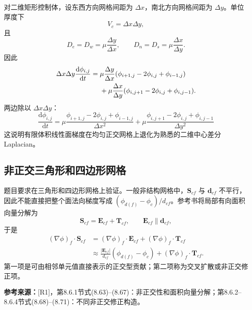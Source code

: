 \documentclass[UTF8,12pt,a4paper]{ctexart}
\numberwithin{equation}{section}
\newcommand{\Rone}{\textnormal{[R1]}}
\newcommand{\source}[1]{%
  \par\smallskip
  \noindent\colorbox{sourcebg}{%
    \parbox{0.955\linewidth}{\raggedright\footnotesize\color{sourcegray}\textbf{参考来源：}#1}%
  }
  \par\smallskip
}
\newcommand{\Sf}{\bm S}
\newcommand{\Ef}{\bm E}
\newcommand{\Tf}{\bm T}
\begin{document}
对二维矩形控制体，设东西方向网格间距为 $\Delta x$，南北方向网格间距为 $\Delta y$。单位厚度下
\begin{equation}
  V_c=\Delta x\Delta y,
  \label{eq:rect_volume}
\end{equation}
且
\begin{equation}
  D_e=D_w=\mu\frac{\Delta y}{\Delta x},
  \qquad
  D_n=D_s=\mu\frac{\Delta x}{\Delta y}.
  \label{eq:rect_D}
\end{equation}
因此
\begin{align}
  \Delta x\Delta y\frac{\mathrm d\phi_{i,j}}{\mathrm dt}
  ={}&\mu\frac{\Delta y}{\Delta x}
  (\phi_{i+1,j}-2\phi_{i,j}+\phi_{i-1,j})
  \notag\\
  &+\mu\frac{\Delta x}{\Delta y}
  (\phi_{i,j+1}-2\phi_{i,j}+\phi_{i,j-1}).
  \label{eq:rect_before_divide}
\end{align}
两边除以 $\Delta x\Delta y$：
\begin{equation}
  \boxed{
  \frac{\mathrm d\phi_{i,j}}{\mathrm dt}
  =\mu\frac{\phi_{i+1,j}-2\phi_{i,j}+\phi_{i-1,j}}{\Delta x^2}
  +\mu\frac{\phi_{i,j+1}-2\phi_{i,j}+\phi_{i,j-1}}{\Delta y^2}}
  \label{eq:rect_laplacian}
\end{equation}
这说明有限体积线性面梯度在均匀正交网格上退化为熟悉的二维中心差分Laplacian。

\subsection{非正交三角形和四边形网格}

题目要求在三角形和四边形网格上验证。一般非结构网格中，$\Sf_{cf}$ 与
$\bm d_{cf}$ 不平行，因此不能直接把整个面法向梯度写成
$(\phi_{d(f)}-\phi_c)/d_{cf}$。参考书将局部有向面积向量分解为
\begin{equation}
  \boxed{\Sf_{cf}=\Ef_{cf}+\Tf_{cf}},
  \qquad
  \Ef_{cf}\parallel\bm d_{cf},
  \label{eq:nonorth_decomposition}
\end{equation}
于是
\begin{align}
  (\nabla\phi)_f\cdot\Sf_{cf}
  &=(\nabla\phi)_f\cdot\Ef_{cf}
    +(\nabla\phi)_f\cdot\Tf_{cf}
    \label{eq:split_grad_1}\\
  &\approx
    \frac{|\Ef_{cf}|}{d_{cf}}(\phi_{d(f)}-\phi_c)
    +(\nabla\phi)_f\cdot\Tf_{cf}.
    \label{eq:split_grad_2}
\end{align}
第一项是可由相邻单元值直接表示的正交型贡献；第二项称为交叉扩散或非正交修正项。

\source{\Rone，第8.6.1节式(8.63)--(8.67)：非正交性和面积向量分解；第8.6.2--8.6.4节式(8.68)--(8.71)：不同非正交修正构造。}
\end{document}
